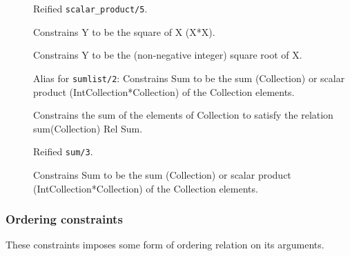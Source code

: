 \begin{description}
\item[]
Reified {\tt scalar_product/5}.

\item[]
Constrains Y to be the square of X (X*X).

\item[]
Constrains Y to be the (non-negative integer) square root of X.

\item[]
Alias for {\tt sumlist/2}: Constrains Sum to be the sum (Collection) or scalar product (IntCollection*Collection) of
the Collection elements.

\item[]
Constrains the sum of the elements of Collection to satisfy the relation sum(Collection) Rel Sum.

\item[]
Reified {\tt sum/3}.

\item[]
Constrains Sum to be the sum (Collection) or scalar product (IntCollection*Collection) of
the Collection elements.

\end{description}

\subsubsection{Ordering constraints}

These constraints imposes some form of ordering relation on its arguments.

